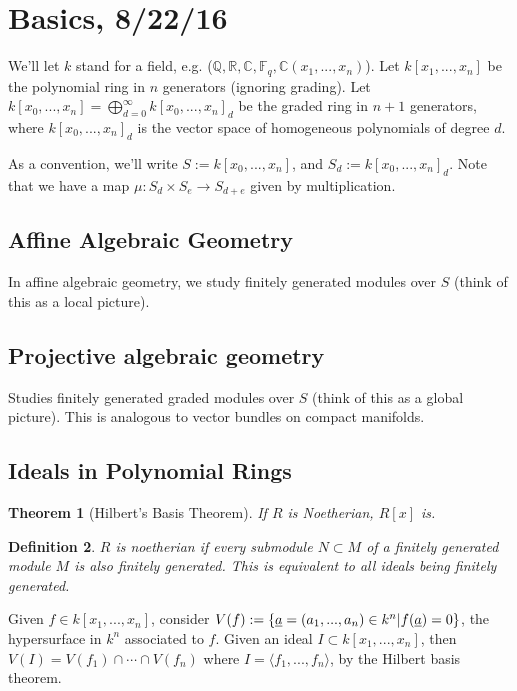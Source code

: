 \documentclass[letterpaper, 12pt]{article}
\newtheorem{thm}{Theorem}[subsection]
\newtheorem{definition}[thm]{Definition}
\newcommand{\rats}{\mathbb{Q}}
\newcommand{\reals}{\mathbb{R}}
\newcommand{\cmplx}{\mathbb{C}}
\newcommand{\polyring}[3]{#1[x_{#2}, ..., x_{#3}]}
\newcommand{\graded}[2]{\bigoplus_{d = 0}^\infty \polyring{#1}{0}{#2}_d}
\newcommand{\ffield}[1]{\mathbb{F}_{#1}}
\begin{document}
\section{Basics, 8/22/16}
We'll let $k$ stand for a field, e.g. ($\rats, \reals, \cmplx, \ffield q, \cmplx(x_1, ..., x_n)$). Let $\polyring k 1 n$ be the polynomial ring in $n$ generators (ignoring grading). Let $\polyring k 0 n = \graded k n$ be the graded ring in $n + 1$ generators, where $\polyring{k}{0}{n}_d$ is the vector space of homogeneous polynomials of degree $d$.

As a convention, we'll write $S := \polyring k 0 n$, and $S_d := \polyring{k}{0}{n}_d$. Note that we have a map $\mu: S_d \times S_e \rightarrow S_{d + e}$ given by multiplication.

\subsection{Affine Algebraic Geometry}
In affine algebraic geometry, we study finitely generated modules over $S$ (think of this as a local picture).

\subsection{Projective algebraic geometry}
Studies finitely generated graded modules over $S$ (think of this as a global picture). This is analogous to vector bundles on compact manifolds. 

\subsection{Ideals in Polynomial Rings}
\begin{thm}[Hilbert's Basis Theorem]
If $R$ is Noetherian, $R[x]$ is.
\end{thm}

\begin{definition}
$R$ is noetherian if every submodule $N \subset M$ of a finitely generated module $M$ is also finitely generated. This is equivalent to all ideals being finitely generated.
\end{definition}

Given $f \in \polyring k 1 n$, consider $V(f) := \{ \uline{a} = (a_1, ..., a_n) \in k^n | f(\uline{a}) = 0\}$, the hypersurface in $k^n$ associated to $f$. Given an ideal $I \subset \polyring k 1 n$, then $V(I) = V(f_1) \cap \cdots \cap V(f_n)$ where $I = \langle f_1, ..., f_n \rangle$, by the Hilbert basis theorem. 
\end{document}
